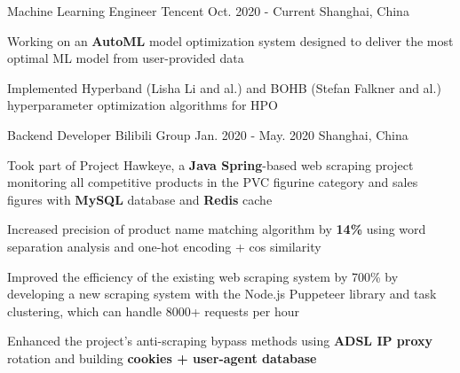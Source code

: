 

\begin{cventries}

  \cventry
    {Machine Learning Engineer} %
    {Tencent} %
    {Oct. 2020 - Current} %
    {Shanghai, China} %
    {
      \begin{cvitems} %
        \item {Working on an \textbf{AutoML} model optimization system designed to deliver the most optimal ML model from user-provided data}
        \item {Implemented Hyperband (Lisha Li and al.) and BOHB (Stefan Falkner and al.) hyperparameter optimization algorithms for HPO}
      \end{cvitems}
    }

  \cventry
    {Backend Developer} %
    {Bilibili Group} %
    {Jan. 2020 - May. 2020} %
    {Shanghai, China} %
    {
      \begin{cvitems} %
        \item {Took part of Project Hawkeye, a \textbf{Java Spring}-based web scraping project monitoring all competitive products in the PVC figurine category and sales figures with \textbf{MySQL} database and \textbf{Redis} cache}
        \item {Increased precision of product name matching algorithm by \textbf{14\%} using word separation analysis and one-hot encoding + cos similarity}
        \item {Improved the efficiency of the existing web scraping system by 700\% by developing a new scraping system with the Node.js Puppeteer library and task clustering, which can handle 8000+ requests per hour}
        \item {Enhanced the project's anti-scraping bypass methods using \textbf{ADSL IP proxy} rotation and building \textbf{cookies + user-agent database}}
      \end{cvitems}
    }


\end{cventries}
